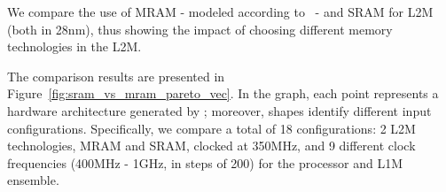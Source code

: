 We compare the use of MRAM - modeled according to~\cite{8310393} - and SRAM for L2M (both in 28nm), thus showing the impact of choosing different memory technologies in the L2M.

\label{ssec:exp_single}


\label{ssec:case_study2}

The comparison results are presented in Figure~\ref{fig:sram_vs_mram_pareto_vec}. In the graph, each point represents a hardware architecture generated by \frameworkname; moreover, shapes identify different input configurations. Specifically, we compare a total of 18 configurations: 2 L2M technologies, MRAM and SRAM, clocked at 350MHz, and 9 different clock frequencies (400MHz - 1GHz, in steps of 200) for the processor and L1M ensemble.

